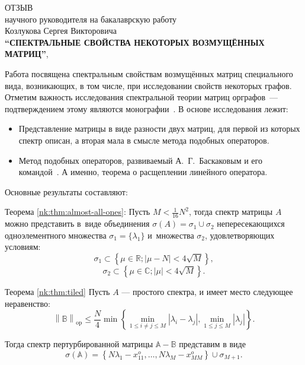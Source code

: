 \begin{center}
  ОТЗЫВ\\
  научного руководителя на бакалаврскую работу\\
  Козлукова Сергея Викторовича\\
  \textbf{``СПЕКТРАЛЬНЫЕ СВОЙСТВА НЕКОТОРЫХ ВОЗМУЩЁННЫХ МАТРИЦ''},
\end{center}

Работа посвящена спектральным свойствам возмущённых матриц
специального вида, возникающих, в том числе, при исследовании свойств некоторых
графов. Отметим важность исследования спектральной теории матриц орграфов~---%
подтверждением этому являются монографии~\cite{cvetkovic1997eigenspaces,cvetkovic1980spectra,godsil2013algebraic}.
В основе исследования лежит:
\begin{itemize}
  \item Представление матрицы в виде разности двух матриц, для первой из которых
    спектр описан, а вторая мала в смысле метода подобных операторов.
    \item Метод подобных операторов, развиваемый А.~Г.~Баскаковым и его
      командой~\cite{baskakov1986theorem,baskakov1994spectral,baskakov2002splitting}.
      А именно, теорема о расщеплении линейного
      оператора.
\end{itemize}

Основные результаты составляют:

Теорема \ref{nk:thm:almost-all-ones}:
    Пусть \( M < \frac{1}{16} N^2 \),
    тогда спектр матрицы \( A \) можно представить в~виде
    объединения \( \sigma\left(A\right) = \sigma_1 \cup \sigma_2 \)
    непересекающихся
    одноэлементного множества \( \sigma_1=\{\lambda_1\} \)
    и~множества \( \sigma_2 \), удовлетворяющих условиям:
    \[ \sigma_1 \subset \left\{ \mu\in\mathbb{R}; \lvert \mu - N \rvert < 4\sqrt{M} \right\}, \]
    \[ \sigma_2 \subset \left\{ \mu\in\mathbb{C}; \lvert \mu \rvert < 4\sqrt{M} \right\}. \]

Теорема \ref{nk:thm:tiled}
Пусть \( A \) --- простого спектра, и имеет место следующее неравенство:
\[
    \left\| \mathbb{B} \right\|_{\mathrm{op}}
        \leq 
        \frac{N}{4}
         \min\left\{
             \min\limits_{1\leq i{\neq}j \leq M }{|\lambda_i - \lambda_j|},
             \min\limits_{1\leq j \leq M}{|\lambda_j|}
         \right\}.
 \]

Тогда спектр пертурбированной матрицы \( \mathbb{A} - \mathbb{B} \) представим в виде
\[
    \sigma\left(\mathbb{A}\right) =
        \left\{
            N\lambda_1 - x_{11}^o, \ldots, N\lambda_M - x_{MM}^o
        \right\}
    \cup \sigma_{M{+}1}.
\]

